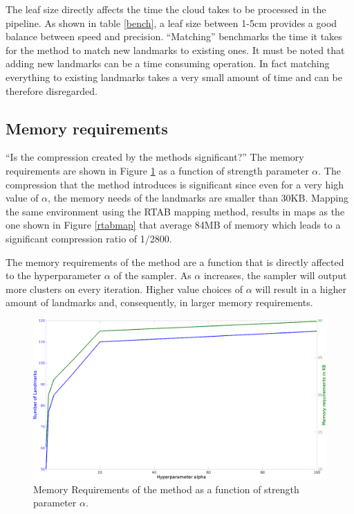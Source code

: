 \documentclass [twoside,hidelinks]{article}
\begin{document}
The leaf size directly affects the time the cloud takes to be processed in the pipeline. As shown in table \ref{bench}, a leaf size between 1-5cm provides a good balance between speed and precision. ``Matching'' benchmarks the time it takes for the method to match new landmarks to existing ones. It must be noted that adding new landmarks can be a time consuming operation. In fact matching everything to existing landmarks takes a very small amount of time and can be therefore disregarded.

\subsection{Memory requirements}
\label{reqs}
``Is the compression created by the methods significant?''
The memory requirements are shown in Figure \ref{memReq} as a function of strength parameter $\alpha$. The compression that the method introduces is significant since even for a very high value of $\alpha$, the memory needs of the landmarks are smaller than 30KB. Mapping the same environment using the RTAB mapping method, results in maps as the one shown in Figure \ref{rtabmap} that average 84MB of memory which leads to a significant compression ratio of 1/2800.

The memory requirements of the method are a function that is directly affected to the hyperparameter $\alpha$ of the sampler. As $\alpha$ increases, the sampler will output more clusters on every iteration. Higher value choices of $\alpha$ will result in a higher amount of landmarks and, consequently, in larger memory requirements.

\begin{figure} [ht!]
  \centering
    \includegraphics [width=.8\textwidth]{memoryRequirements2}
    \caption{Memory Requirements of the method as a function of strength parameter $\alpha$.}
  \label{memReq}
\end{figure}
\end{document}
